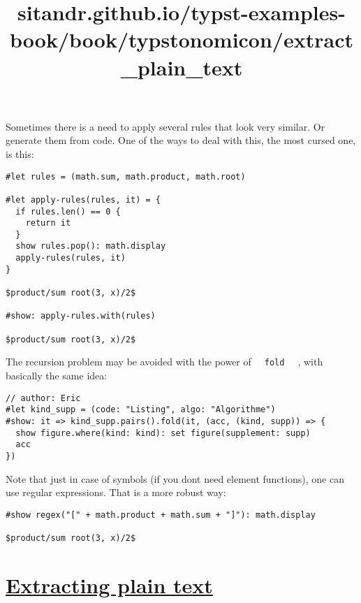 Sometimes there is a need to apply several rules that look very similar.
Or generate them from code. One of the ways to deal with this, the most
cursed one, is this:

\begin{verbatim}
#let rules = (math.sum, math.product, math.root)

#let apply-rules(rules, it) = {
  if rules.len() == 0 {
    return it
  }
  show rules.pop(): math.display
  apply-rules(rules, it)
}

$product/sum root(3, x)/2$

#show: apply-rules.with(rules)

$product/sum root(3, x)/2$
\end{verbatim}

\pandocbounded{}

The recursion problem may be avoided with the power of
\texttt{\ }{\texttt{\ fold\ }}\texttt{\ } , with basically the same
idea:

\begin{verbatim}
// author: Eric
#let kind_supp = (code: "Listing", algo: "Algorithme")
#show: it => kind_supp.pairs().fold(it, (acc, (kind, supp)) => {
  show figure.where(kind: kind): set figure(supplement: supp)
  acc
})
\end{verbatim}

\pandocbounded{}

Note that just in case of symbols (if you don\textquotesingle t need
element functions), one can use regular expressions. That is a more
robust way:

\begin{verbatim}
#show regex("[" + math.product + math.sum + "]"): math.display

$product/sum root(3, x)/2$
\end{verbatim}

\pandocbounded{}


\title{sitandr.github.io/typst-examples-book/book/typstonomicon/extract_plain_text}

\section{\texorpdfstring{\hyperref[extracting-plain-text]{Extracting
plain text}}{Extracting plain text}}\label{extracting-plain-text}

